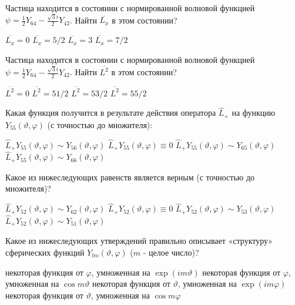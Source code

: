 \documentclass[11pt,a4paper]{exam}
\begin{document}
\begin{questions}
\question Частица находится в состоянии с нормированной волновой функцией $\psi  = \frac{1}{2}{Y_{64}} - \frac{{\sqrt 3 i}}{2}{Y_{42}}$. Найти $\overline {{L_x}} $ в этом состоянии?
\begin{choices}
\choice $\overline {{L_x}}  = 0$      
\choice $\overline {{L_x}}  = 5/2$    
\choice $\overline {{L_x}}  = 3$      
\choice $\overline {{L_x}}  = 7/2$
\end{choices}

\question Частица находится в состоянии с нормированной волновой функцией $\psi  = \frac{1}{2}{Y_{64}} - \frac{{\sqrt 3 i}}{2}{Y_{42}}$. Найти $\overline {{L^2}} $ в этом состоянии?
\begin{choices}
\choice $\overline {{L^2}}  = 0$      
\choice $\overline {{L^2}}  = 51/2$      
\choice $\overline {{L^2}}  = 53/2$      
\choice $\overline {{L^2}}  = 55/2$
\end{choices}

\question Какая функция получится в результате действия оператора ${\hat L_ + }$ на функцию ${Y_{55}}(\vartheta ,\varphi )$ (с точностью до множителя):
\begin{choices}
\choice ${\hat L_ + }{Y_{55}}(\vartheta ,\varphi ) \sim {Y_{56}}(\vartheta ,\varphi )$         
\choice ${\hat L_ + }{Y_{55}}(\vartheta ,\varphi ) \equiv 0$
\choice ${\hat L_ + }{Y_{55}}(\vartheta ,\varphi ) \sim {Y_{65}}(\vartheta ,\varphi )$         
\choice ${\hat L_ + }{Y_{55}}(\vartheta ,\varphi ) \sim {Y_{66}}(\vartheta ,\varphi )$
\end{choices}

\question Какое из нижеследующих равенств является верным (с точностью до множителя)?
\begin{choices}
\choice ${\hat L_ + }{Y_{52}}(\vartheta ,\varphi ) \sim {Y_{62}}(\vartheta ,\varphi )$         
\choice ${\hat L_ + }{Y_{52}}(\vartheta ,\varphi ) \equiv 0$
\choice ${\hat L_ + }{Y_{52}}(\vartheta ,\varphi ) \sim {Y_{53}}(\vartheta ,\varphi )$         
\choice ${\hat L_ + }{Y_{52}}(\vartheta ,\varphi ) \sim {Y_{51}}(\vartheta ,\varphi )$
\end{choices}

\question Какое из нижеследующих утверждений правильно описывает «структуру» сферических функций ${Y_{lm}}(\vartheta ,\varphi )$ ($m$ - целое число)?
\begin{choices}
\choice некоторая функция от $\varphi $, умноженная на $\exp (im\vartheta )$
\choice некоторая функция от $\varphi $, умноженная на $\cos m\vartheta $
\choice некоторая функция от $\vartheta $, умноженная на $\exp (im\varphi )$
\choice некоторая функция от $\vartheta $, умноженная на $\cos m\varphi $ 
\end{choices}


\end{questions}
\end{document}

